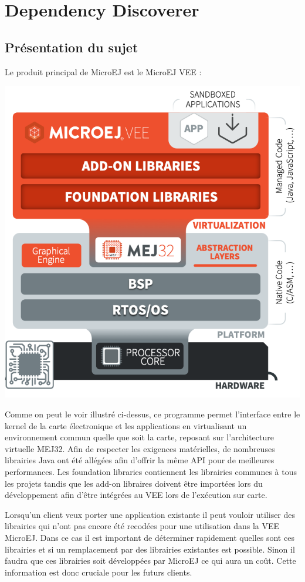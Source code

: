 \documentclass[french,a4paper,12pt]{report}
\begin{document}
\chapter{Dependency Discoverer}

\section{Présentation du sujet}

Le produit principal de MicroEJ est le MicroEJ VEE :

\begin{center}
  \includegraphics[width=.6\textwidth]{ressources/schemas/Implementations-on-hardware_minimize.png}
\end{center}

 Comme on peut le voir illustré ci-dessus, ce programme permet l’interface entre le kernel de la carte électronique et les applications en virtualisant un environnement commun quelle que soit la carte, reposant sur l’architecture virtuelle MEJ32. Afin de respecter les exigences matérielles, de nombreuses librairies Java ont été allégées afin d’offrir la même API pour de meilleures performances. Les foundation libraries contiennent les librairies communes à tous les projets tandis que les add-on libraires doivent être importées lors du développement afin d’être intégrées au VEE lors de l’exécution sur carte.

Lorsqu’un client veux porter une application existante il peut vouloir utiliser des librairies qui n’ont pas encore été recodées pour une utilisation dans la VEE MicroEJ. Dans ce cas il est important de déterminer rapidement quelles sont ces librairies et si un remplacement par des librairies existantes est possible. Sinon il faudra que ces librairies soit développées par MicroEJ ce qui aura un coût. Cette information est donc cruciale pour les futurs clients.
 
\end{document}
